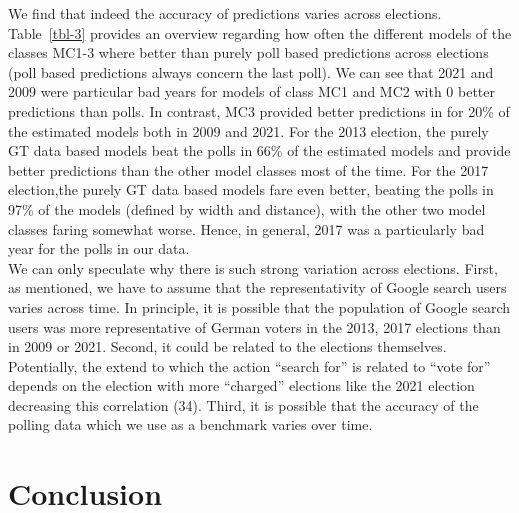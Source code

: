 \documentclass[
  letterpaper,
  DIV=11,
  numbers=noendperiod]{scrartcl}
\begin{document}
We find that indeed the accuracy of predictions varies across elections.
Table~\ref{tbl-3} provides an overview regarding how often the different
models of the classes MC1-3 where better than purely poll based
predictions across elections (poll based predictions always concern the
last poll). We can see that 2021 and 2009 were particular bad years for
models of class MC1 and MC2 with 0 better predictions than polls. In
contrast, MC3 provided better predictions in for 20\% of the estimated
models both in 2009 and 2021. For the 2013 election, the purely GT data
based models beat the polls in 66\% of the estimated models and provide
better predictions than the other model classes most of the time. For
the 2017 election,the purely GT data based models fare even better,
beating the polls in 97\% of the models (defined by width and distance),
with the other two model classes faring somewhat worse. Hence, in
general, 2017 was a particularly bad year for the polls in our data.\\
We can only speculate why there is such strong variation across
elections. First, as mentioned, we have to assume that the
representativity of Google search users varies across time. In
principle, it is possible that the population of Google search users was
more representative of German voters in the 2013, 2017 elections than in
2009 or 2021. Second, it could be related to the elections themselves.
Potentially, the extend to which the action ``search for'' is related to
``vote for'' depends on the election with more ``charged'' elections
like the 2021 election decreasing this correlation (34). Third, it is
possible that the accuracy of the polling data which we use as a
benchmark varies over time.

\hypertarget{sec-conclusion}{%
\section{Conclusion}\label{sec-conclusion}}
\end{document}
